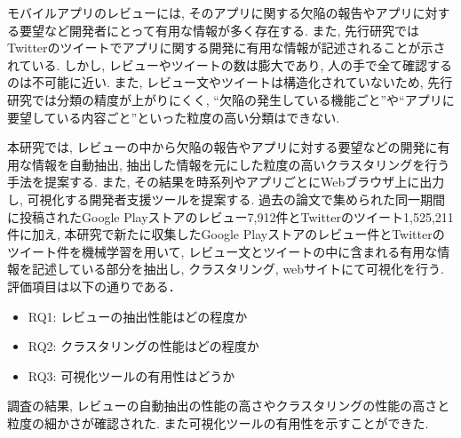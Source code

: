 
モバイルアプリのレビューには, そのアプリに関する欠陥の報告やアプリに対する要望など開発者にとって有用な情報が多く存在する. また, 先行研究ではTwitterのツイートでアプリに関する開発に有用な情報が記述されることが示されている. しかし, レビューやツイートの数は膨大であり, 人の手で全て確認するのは不可能に近い. 
また, レビュー文やツイートは構造化されていないため, 先行研究では分類の精度が上がりにくく, ``欠陥の発生している機能ごと''や``アプリに要望している内容ごと''といった粒度の高い分類はできない. 

本研究では, レビューの中から欠陥の報告やアプリに対する要望などの開発に有用な情報を自動抽出, 抽出した情報を元にした粒度の高いクラスタリングを行う手法を提案する. また, その結果を時系列やアプリごとにWebブラウザ上に出力し, 可視化する開発者支援ツールを提案する.
過去の論文で集められた同一期間に投稿されたGoogle Playストアのレビュー7,912件とTwitterのツイート1,525,211件に加え, 本研究で新たに収集したGoogle Playストアのレビュー件とTwitterのツイート件を機械学習を用いて, レビュー文とツイートの中に含まれる有用な情報を記述している部分を抽出し, クラスタリング, webサイトにて可視化を行う. 評価項目は以下の通りである．
\begin{itemize}
    \item RQ1: レビューの抽出性能はどの程度か
    \item RQ2: クラスタリングの性能はどの程度か
    \item RQ3: 可視化ツールの有用性はどうか
\end{itemize}

調査の結果, レビューの自動抽出の性能の高さやクラスタリングの性能の高さと粒度の細かさが確認された. また可視化ツールの有用性を示すことができた. 
